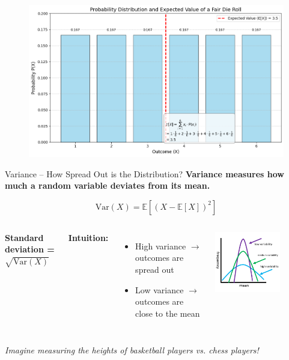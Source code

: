 \documentclass[handout,aspectratio=169]{beamer}
\begin{document}
\begin{frame}[plain]
	\begin{figure}[htbp]
		\centering
		\includegraphics[width=\textwidth]{chapter_figs/01_figs/expectation.png}
	\end{figure}
\end{frame}

\begin{frame}{Variance – How Spread Out is the Distribution?}
  \textbf{Variance measures how much a random variable deviates from its mean.}

  \vspace{1em}
  \[
    \text{Var}(X) = \mathbb{E}[(X - \mathbb{E}[X])^2]
  \]
  \begin{columns}
\textbf{Standard deviation = } $\sqrt{\text{Var}(X)}$

  \vspace{1em}
  \textbf{Intuition:}
  \begin{itemize}
    \item High variance $\rightarrow$ outcomes are spread out
    \item Low variance $\rightarrow$ outcomes are close to the mean
  \end{itemize}
    \includegraphics[width=0.7\textwidth]{chapter_figs/01_figs/variance.png}
\end{columns}

  

  \vspace{1em}
  \textit{Imagine measuring the heights of basketball players vs. chess players!}
\end{frame}
\end{document}
